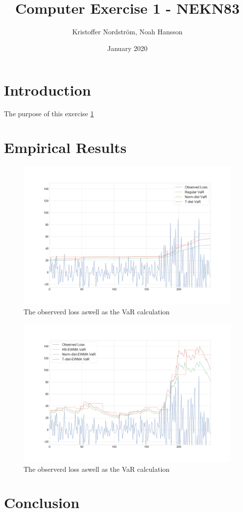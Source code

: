 \documentclass[a4paper]{article}
\title{Computer Exercise 1 - NEKN83}
\author{Kristoffer Nordström, Noah Hansson}
\date{January 2020}
\begin{document}
\maketitle

\section{Introduction}
The purpose of this exercise \ref{var1}

\section{Empirical Results}

\begin{figure}
    \includegraphics[width=\textwidth]{VaR1.png}
    \caption{The observerd loss aswell as the VaR calculation}
    \label{var1}
\end{figure}

\begin{figure}
    \includegraphics[width=\textwidth]{VaR2.png}
    \caption{The observerd loss aswell as the VaR calculation}
    \label{var2}
\end{figure}

\section{Conclusion}
\end{document}
